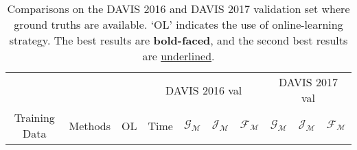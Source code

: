 \begin{table}
\caption{Comparisons on the DAVIS 2016 and DAVIS 2017 validation set where ground truths are available. `OL' indicates the use of online-learning strategy. The best results are \textbf{bold-faced}, and the second best results are \underline{underlined}.
}
\label{tab_davis16}
\centering
\begin{tabular}{clc|cccc|ccc}
\toprule
                               &                                        &            & \multicolumn{4}{c|}{DAVIS 2016 val}                                & \multicolumn{3}{c}{DAVIS 2017 val}                     \\
\multicolumn{1}{c}{Training Data} & \multicolumn{1}{c}{Methods}            & \; OL \;        & Time     & $\mathcal{G_M}$ & $\mathcal{J_M}$ & $\mathcal{F_M}$ & $\mathcal{G_M}$ & $\mathcal{J_M}$ & $\mathcal{F_M}$ \\
\midrule


\end{tabular}
\end{table}
